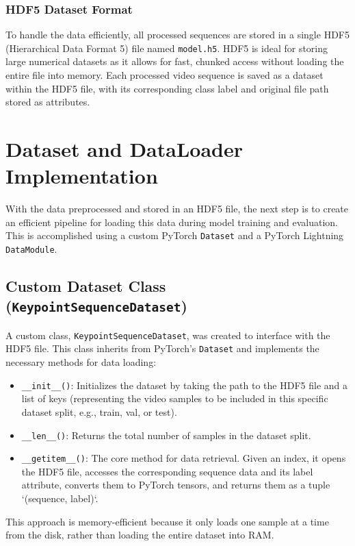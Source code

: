 \documentclass[11pt, a4paper]{article}
\begin{document}
\subsubsection{HDF5 Dataset Format}
To handle the data efficiently, all processed sequences are stored in a single HDF5 (Hierarchical Data Format 5) file named \texttt{model.h5}. HDF5 is ideal for storing large numerical datasets as it allows for fast, chunked access without loading the entire file into memory. Each processed video sequence is saved as a dataset within the HDF5 file, with its corresponding class label and original file path stored as attributes.



\section{Dataset and DataLoader Implementation}
With the data preprocessed and stored in an HDF5 file, the next step is to create an efficient pipeline for loading this data during model training and evaluation. This is accomplished using a custom PyTorch \texttt{Dataset} and a PyTorch Lightning \texttt{DataModule}.

\subsection{Custom Dataset Class (\texttt{KeypointSequenceDataset})}
A custom class, \texttt{KeypointSequenceDataset}, was created to interface with the HDF5 file. This class inherits from PyTorch's \texttt{Dataset} and implements the necessary methods for data loading:
\begin{itemize}
    \item \texttt{\_\_init\_\_()}: Initializes the dataset by taking the path to the HDF5 file and a list of keys (representing the video samples to be included in this specific dataset split, e.g., train, val, or test).
    \item \texttt{\_\_len\_\_()}: Returns the total number of samples in the dataset split.
    \item \texttt{\_\_getitem\_\_()}: The core method for data retrieval. Given an index, it opens the HDF5 file, accesses the corresponding sequence data and its label attribute, converts them to PyTorch tensors, and returns them as a tuple `(sequence, label)`.
\end{itemize}
This approach is memory-efficient because it only loads one sample at a time from the disk, rather than loading the entire dataset into RAM.
\end{document}

